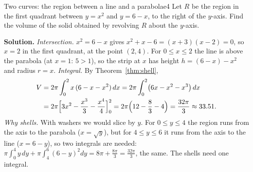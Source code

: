 \documentclass[11pt]{article}
\begin{document}
\begin{exmp}{Two curves: the region between a line and a parabola}{e4}
Let $R$ be the region in the first quadrant between $y=x^2$ and $y=6-x$, to the right of the $y$-axis. Find the volume of the solid obtained by revolving $R$ about the $y$-axis.

\textbf{Solution.} \emph{Intersection.} $x^2=6-x$ gives $x^2+x-6=(x+3)(x-2)=0$, so $x=2$ in the first quadrant, at the point $(2,4)$. For $0\le x\le2$ the line is above the parabola (at $x=1$: $5>1$), so the strip at $x$ has height $h=(6-x)-x^2$ and radius $r=x$.
\emph{Integral.} By Theorem~\ref{thm:shell},
\[
\begin{aligned}V&=2\pi\int_0^2x\,(6-x-x^2)\,dx=2\pi\int_0^2\bigl(6x-x^2-x^3\bigr)\,dx\\ &=2\pi\Bigl[3x^2-\frac{x^3}3-\frac{x^4}4\Bigr]_0^2=2\pi\Bigl(12-\frac83-4\Bigr)=\frac{32\pi}3\approx33.51 .
\end{aligned}
\]
\emph{Why shells.} With washers we would slice by $y$. For $0\le y\le4$ the region runs from the axis to the parabola ($x=\sqrt y$), but for $4\le y\le6$ it runs from the axis to the line ($x=6-y$), so two integrals are needed: $\pi\int_0^4y\,dy+\pi\int_4^6(6-y)^2dy=8\pi+\frac{8\pi}3=\frac{32\pi}3$, the same. The shells need one integral.


\end{exmp}
\end{document}
